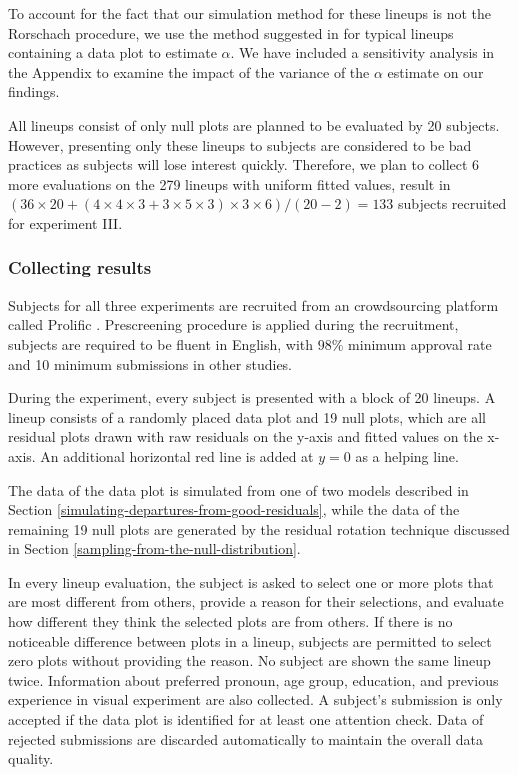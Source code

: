\documentclass[]{interact}
\theoremstyle{plain}%
\theoremstyle{definition}
\theoremstyle{remark}
\begin{document}
To account for the fact that our simulation method for these lineups is
not the Rorschach procedure, we use the method suggested in
\citet{vanderplas2021statistical} for typical lineups containing a data
plot to estimate \(\alpha\). We have included a sensitivity analysis in
the Appendix to examine the impact of the variance of the \(\alpha\)
estimate on our findings.

All lineups consist of only null plots are planned to be evaluated by 20
subjects. However, presenting only these lineups to subjects are
considered to be bad practices as subjects will lose interest quickly.
Therefore, we plan to collect 6 more evaluations on the 279 lineups with
uniform fitted values, result in
\((36 \times 20 + (4 \times 4 \times 3 + 3 \times 5 \times 3) \times 3 \times 6) / (20-2) = 133\)
subjects recruited for experiment III.

\hypertarget{collecting-results}{%
\subsubsection{Collecting results}\label{collecting-results}}

Subjects for all three experiments are recruited from an crowdsourcing
platform called Prolific \citep{palan2018prolific}. Prescreening
procedure is applied during the recruitment, subjects are required to be
fluent in English, with \(98\%\) minimum approval rate and 10 minimum
submissions in other studies.

During the experiment, every subject is presented with a block of 20
lineups. A lineup consists of a randomly placed data plot and 19 null
plots, which are all residual plots drawn with raw residuals on the
y-axis and fitted values on the x-axis. An additional horizontal red
line is added at \(y = 0\) as a helping line.

The data of the data plot is simulated from one of two models described
in Section \ref{simulating-departures-from-good-residuals}, while the
data of the remaining 19 null plots are generated by the residual
rotation technique discussed in Section
\ref{sampling-from-the-null-distribution}.

In every lineup evaluation, the subject is asked to select one or more
plots that are most different from others, provide a reason for their
selections, and evaluate how different they think the selected plots are
from others. If there is no noticeable difference between plots in a
lineup, subjects are permitted to select zero plots without providing
the reason. No subject are shown the same lineup twice. Information
about preferred pronoun, age group, education, and previous experience
in visual experiment are also collected. A subject's submission is only
accepted if the data plot is identified for at least one attention
check. Data of rejected submissions are discarded automatically to
maintain the overall data quality.
\end{document}
